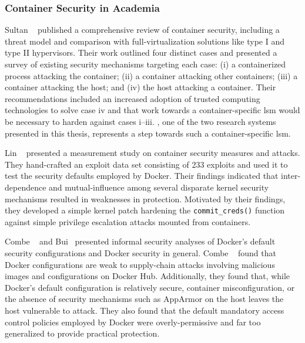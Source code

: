 
\subsubsection{Container Security in Academia}%
\label{sss:container-security-academia}

Sultan \etal~\cite{sultan2019_container_security} published a comprehensive review of
container security, including a threat model and comparison with full-virtualization
solutions like type I and type II hypervisors. Their work outlined four distinct cases and
presented a survey of existing security mechanisms targeting each case: (i)
a containerized process attacking the container; (ii) a container attacking other containers;
(iii) a container attacking the host; and (iv) the host attacking a container. Their
recommendations included an increased adoption of trusted computing technologies to solve
case iv and that work towards a container-specific \gls{lsm} would be necessary to harden
against cases i--iii. \bpfcontain{}, one of the two research systems presented in this thesis,
represents a step towards such a container-specific \gls{lsm}.

Lin \etal~\cite{lin2018_container_security} presented a measurement study on container
security measures and attacks. They hand-crafted an exploit data set consisting of 233
exploits and used it to test the security defaults employed by Docker. Their findings
indicated that inter-dependence and mutual-influence among several disparate kernel
security mechanisms resulted in weaknesses in protection. Motivated by their findings,
they developed a simple kernel patch hardening the \texttt{commit\_creds()} function
against simple privilege escalation attacks mounted from containers.

Combe \etal~\cite{combe2016_to_docker} and Bui~\cite{bui2015_docker_analysis} presented
informal security analyses of Docker's default security configurations and Docker security
in general. Combe \etal~\cite{combe2016_to_docker} found that Docker configurations are
weak to supply-chain attacks involving malicious images and configurations on Docker Hub.
Additionally, they found that, while Docker's default configuration is relatively secure,
container misconfiguration, or the absence of security mechanisms such as AppArmor on the
host leaves the host vulnerable to attack. They also found that the default mandatory
access control policies employed by Docker were overly-permissive and far too generalized
to provide practical protection.

